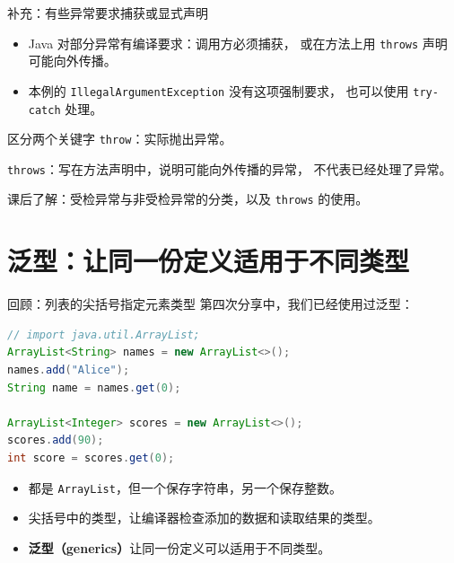 \documentclass[aspectratio=169]{beamer}
\begin{document}
\begin{frame}{补充：有些异常要求捕获或显式声明}
  \begin{itemize}
    \item Java 对部分异常有编译要求：调用方必须捕获，
      或在方法上用 \texttt{throws} 声明可能向外传播。
    \item 本例的 \texttt{IllegalArgumentException} 没有这项强制要求，
      也可以使用 \texttt{try-catch} 处理。
  \end{itemize}
  \bigskip
  \begin{block}{区分两个关键字}
    \texttt{throw}：实际抛出异常。\par\medskip
    \texttt{throws}：写在方法声明中，说明可能向外传播的异常，
    不代表已经处理了异常。
  \end{block}
  \medskip
  课后了解：受检异常与非受检异常的分类，以及 \texttt{throws} 的使用。
\end{frame}

\section{泛型：让同一份定义适用于不同类型}

\begin{frame}[fragile]{回顾：列表的尖括号指定元素类型}
  第四次分享中，我们已经使用过泛型：
  \begin{lstlisting}[language=Java]
// import java.util.ArrayList;
ArrayList<String> names = new ArrayList<>();
names.add("Alice");
String name = names.get(0);

ArrayList<Integer> scores = new ArrayList<>();
scores.add(90);
int score = scores.get(0);
  \end{lstlisting}
  \begin{itemize}
    \item 都是 \texttt{ArrayList}，但一个保存字符串，另一个保存整数。
    \item 尖括号中的类型，让编译器检查添加的数据和读取结果的类型。
    \item \textbf{泛型（generics）}让同一份定义可以适用于不同类型。
  \end{itemize}
\end{frame}
\end{document}
